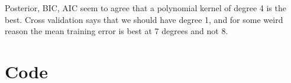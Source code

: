 \documentclass[12pt]{article}
\begin{document}
Posterior, BIC, AIC seem to agree that a polynomial kernel of degree 4 is the best. Cross validation says that we should have degree 1, and for some weird reason the mean training error is best at 7 degrees and not 8. 
% 
% 
% 
\appendix
\section*{Code}
\end{document}
